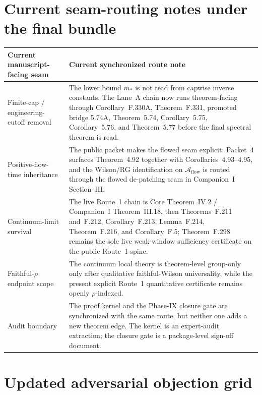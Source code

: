 \documentclass[11pt]{article}
\begin{document}
\section{Current seam-routing notes under the final bundle}

\begin{center}
\small
\begin{tabularx}{\linewidth}{@{}L{3.0cm}Y@{}}
\toprule
\textbf{Current manuscript-facing seam} & \textbf{Current synchronized route note}\\
\midrule
Finite-cap / engineering-cutoff removal & The lower bound $m_{\ast}$ is not read from capwise inverse constants. The Lane~A chain now runs theorem-facing through Corollary~F.330A, Theorem~F.331, promoted bridge 5.74A, Theorem~5.74, Corollary~5.75, Corollary~5.76, and Theorem~5.77 before the final spectral theorem is read.\\
Positive-flow-time inheritance & The public packet makes the flowed seam explicit: Packet~4 surfaces Theorem~4.92 together with Corollaries~4.93--4.95, and the Wilson/RG identification on $\mathcal A_{\mathrm{flow}}$ is routed through the flowed de-patching seam in Companion~I Section~III.\\
Continuum-limit survival & The live Route~1 chain is Core Theorem~IV.2 / Companion~I Theorem~III.18, then Theorems~F.211 and~F.212, Corollary~F.213, Lemma~F.214, Theorem~F.216, and Corollary~F.5; Theorem~F.298 remains the sole live weak-window sufficiency certificate on the public Route~1 spine.\\
Faithful-$\rho$ endpoint scope & The continuum local theory is theorem-level group-only only after qualitative faithful-Wilson universality, while the present explicit Route~1 quantitative certificate remains openly $\rho$-indexed.\\
Audit boundary & The proof kernel and the Phase-IX closure gate are synchronized with the same route, but neither one adds a new theorem edge. The kernel is an expert-audit extraction; the closure gate is a package-level sign-off document.\\
\bottomrule
\end{tabularx}
\end{center}

\section{Updated adversarial objection grid}
\end{document}
